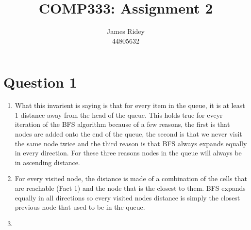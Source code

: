 \documentclass[journal,a4paper]{IEEEtran}
\begin{document}
\onecolumn

\title{COMP333: Assignment 2}
\author{James Ridey\\
44805632}
\maketitle
%



\section*{Question 1}
\begin{enumerate}
	\item What this invarient is saying is that for every item in the queue, it is at least 1 distance away from the head of the queue. This holds true for eveyr iteration of the BFS algorithm because of a few reasons, the first is that nodes are added onto the end of the queue, the second is that we never visit the same node twice and the third reason is that BFS always expands equally in every direction. For these three reasons nodes in the queue will always be in ascending distance.
	\item For every visited node, the distance is made of a combination of the cells that are reachable (Fact 1) and the node that is the closest to them. BFS expands equally in all directions so every visited nodes distance is simply the closest previous node that used to be in the queue.
	\item 
\end{enumerate}
\end{document}
